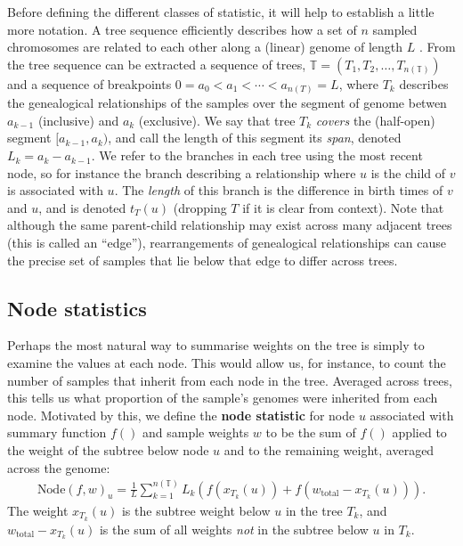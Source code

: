 \documentclass{article}
\newcommand{\node}{\mbox{Node}} %
\newcommand{\treeseq}{\mathbb{T}} %
\newcommand{\iw}{w} %
\newcommand{\tiw}{w_\text{total}} %
\newcommand{\nw}{x} %
\begin{document}
Before defining the different classes of statistic,
it will help to establish a little more notation.
A tree sequence efficiently describes how a set of $n$ sampled chromosomes
are related to each other along a (linear) genome of length $L$ \citep{kelleher2016efficient,kelleher2018efficient}.
From the tree sequence can be extracted a sequence of trees,
$\treeseq = (T_1, T_2, \ldots, T_{n(\treeseq)})$
and a sequence of breakpoints $0 = a_0 < a_1 < \cdots < a_{n(T)} = L$,
where $T_k$ describes the genealogical relationships of the samples
over the segment of genome betwen $a_{k-1}$ (inclusive) and $a_k$ (exclusive).
We say that tree $T_k$ \emph{covers} the (half-open) segment $[a_{k-1}, a_k)$,
and call the length of this segment its \emph{span}, denoted $L_k = a_k - a_{k-1}$.
We refer to the branches in each tree using the most recent node,
so for instance the branch describing a relationship where $u$ is the child of $v$
is associated with $u$.
The \emph{length} of this branch is the difference in birth times of $v$ and $u$,
and is denoted $t_T(u)$ (dropping $T$ if it is clear from context).
Note that although the same parent-child relationship may exist across many adjacent trees
(this is called an ``edge''),
rearrangements of genealogical relationships
can cause the precise set of samples that lie below that edge to differ across
trees.


\subsection*{Node statistics}

Perhaps the most natural way to summarise weights on the tree
is simply to examine the values at each node.
This would allow us, for instance, to 
count the number of samples that inherit from each node in the tree. 
Averaged across trees,
this tells us what proportion of the sample's genomes were inherited from each node.
Motivated by this, we define the
\textbf{node statistic} for node $u$
associated with summary function $f()$ and sample weights $\iw$
to be the sum of $f()$ applied to the weight of the subtree below node $u$
and to the remaining weight,
averaged across the genome:
\begin{align}
    \node(f, \iw)_u
    =
    \frac{1}{L} \sum_{k=1}^{n(\treeseq)} L_k \left( f(\nw_{T_k}(u)) + f(\tiw - \nw_{T_k}(u)) \right).
\end{align}
The weight $\nw_{T_k}(u)$ is the subtree weight below $u$ in the tree $T_k$,
and $\tiw - \nw_{T_k}(u)$ is the sum of all weights \emph{not} in the subtree below $u$ in $T_k$.
\end{document}
